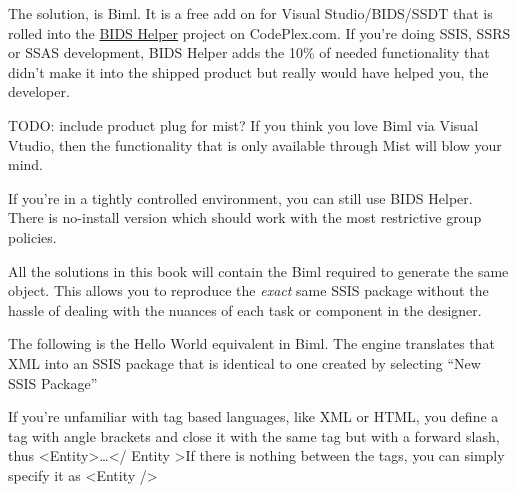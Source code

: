 The solution, is Biml. It is a free add on for Visual Studio/BIDS/SSDT that is rolled into the \href{http://bidshelper.codeplex.com/}{BIDS Helper} project on CodePlex.com. If you're doing SSIS, SSRS or SSAS development, BIDS Helper adds the 10\% of needed functionality that didn't make it into the shipped product but really would have helped you, the developer. 

TODO: include product plug for mist? If you think you love Biml via Visual Vtudio, then the functionality that is only available through Mist will blow your mind.

If you're in a tightly controlled environment, you can still use BIDS Helper. There is no-install version which should work with the most restrictive group policies. 

All the solutions in this book will contain the Biml required to generate the same object. This allows you to reproduce the {\em exact} same SSIS package without the hassle of dealing with the nuances of each task or component in the designer.

The following is the Hello World equivalent in Biml. The engine translates that XML into an SSIS package that is identical to one created by selecting ``New SSIS Package''



If you're unfamiliar with tag based languages, like XML or HTML, you define a tag with angle brackets and close it with the same tag but with a forward slash, thus \textless Entity\textgreater \ldots \textless/ Entity \textgreater If there is nothing between the tags, you can simply specify it as \textless Entity /\textgreater









